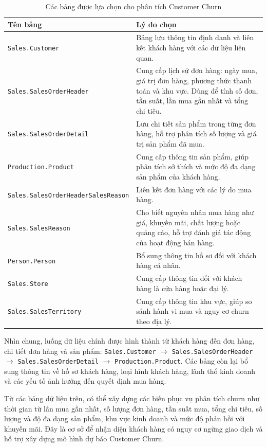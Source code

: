 \documentclass[a4paper,12pt]{article}
\numberwithin{figure}{section}
\numberwithin{table}{section}
\begin{document}
\begin{table}[H]
\centering
\caption{Các bảng được lựa chọn cho phân tích Customer Churn}
\label{tab:c1-churn-tables}
\small
\begin{tabularx}{\textwidth}{>{\raggedright\arraybackslash}p{5.4cm} X}
\toprule
\rowcolor{tblhead} \textbf{Tên bảng} & \textbf{Lý do chọn} \\
\midrule
\texttt{Sales.Customer} & Bảng lưu thông tin định danh và liên kết khách hàng với các dữ liệu liên quan. \\
\texttt{Sales.SalesOrderHeader} & Cung cấp lịch sử đơn hàng: ngày mua, giá trị đơn hàng, phương thức thanh toán và khu vực. Dùng để tính số đơn, tần suất, lần mua gần nhất và tổng chi tiêu. \\
\texttt{Sales.SalesOrderDetail} & Lưu chi tiết sản phẩm trong từng đơn hàng, hỗ trợ phân tích số lượng và giá trị sản phẩm đã mua. \\
\texttt{Production.Product} & Cung cấp thông tin sản phẩm, giúp phân tích sở thích và mức độ đa dạng sản phẩm của khách hàng. \\
\texttt{Sales.SalesOrderHeader\-SalesReason} & Liên kết đơn hàng với các lý do mua hàng. \\
\texttt{Sales.SalesReason} & Cho biết nguyên nhân mua hàng như giá, khuyến mãi, chất lượng hoặc quảng cáo, hỗ trợ đánh giá tác động của hoạt động bán hàng. \\
\texttt{Person.Person} & Bổ sung thông tin hồ sơ đối với khách hàng cá nhân. \\
\texttt{Sales.Store} & Cung cấp thông tin đối với khách hàng là cửa hàng hoặc đại lý. \\
\texttt{Sales.SalesTerritory} & Cung cấp thông tin khu vực, giúp so sánh hành vi mua và nguy cơ churn theo địa lý. \\
\bottomrule
\end{tabularx}
\end{table}

Nhìn chung, luồng dữ liệu chính được hình thành từ khách hàng đến đơn hàng, chi tiết đơn hàng và sản phẩm: \texttt{Sales.\allowbreak Customer} $\rightarrow$ \texttt{Sales.\allowbreak SalesOrderHeader} $\rightarrow$ \texttt{Sales.\allowbreak SalesOrderDetail} $\rightarrow$ \texttt{Production.\allowbreak Product}. Các bảng còn lại bổ sung thông tin về hồ sơ khách hàng, loại hình khách hàng, lãnh thổ kinh doanh và các yếu tố ảnh hưởng đến quyết định mua hàng.

Từ các bảng dữ liệu trên, có thể xây dựng các biến phục vụ phân tích churn như thời gian từ lần mua gần nhất, số lượng đơn hàng, tần suất mua, tổng chi tiêu, số lượng và độ đa dạng sản phẩm, khu vực kinh doanh và mức độ phản hồi với khuyến mãi. Đây là cơ sở để nhận diện khách hàng có nguy cơ ngừng giao dịch và hỗ trợ xây dựng mô hình dự báo Customer Churn.
\end{document}
